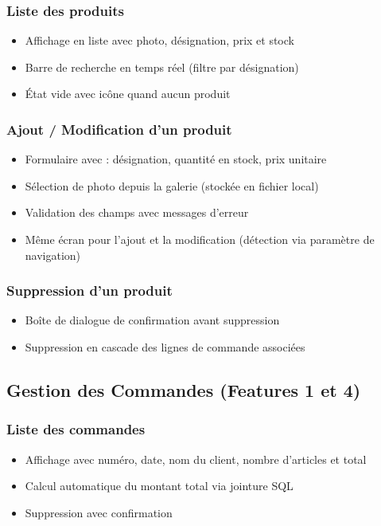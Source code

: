 \documentclass[12pt,a4paper]{article}
\begin{document}
\subsubsection{Liste des produits}
\begin{itemize}
    \item Affichage en liste avec photo, d\'esignation, prix et stock
    \item Barre de recherche en temps r\'eel (filtre par d\'esignation)
    \item \'Etat vide avec ic\^one quand aucun produit
\end{itemize}

\subsubsection{Ajout / Modification d'un produit}
\begin{itemize}
    \item Formulaire avec : d\'esignation, quantit\'e en stock, prix unitaire
    \item S\'election de photo depuis la galerie (stock\'ee en fichier local)
    \item Validation des champs avec messages d'erreur
    \item M\^eme \'ecran pour l'ajout et la modification (d\'etection via param\`etre de navigation)
\end{itemize}

\subsubsection{Suppression d'un produit}
\begin{itemize}
    \item Bo\^ite de dialogue de confirmation avant suppression
    \item Suppression en cascade des lignes de commande associ\'ees
\end{itemize}

\subsection{Gestion des Commandes (Features 1 et 4)}

\subsubsection{Liste des commandes}
\begin{itemize}
    \item Affichage avec num\'ero, date, nom du client, nombre d'articles et total
    \item Calcul automatique du montant total via jointure SQL
    \item Suppression avec confirmation
\end{itemize}
\end{document}
